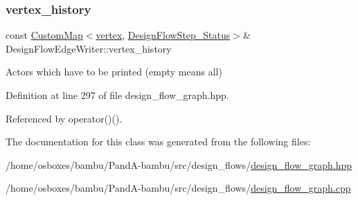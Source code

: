 \subsubsection{\texorpdfstring{vertex\+\_\+history}{vertex\_history}}
{\footnotesize\ttfamily const \hyperlink{custom__map_8hpp_a18ca01763abbe3e5623223bfe5aaac6b}{Custom\+Map}$<$\hyperlink{graph_8hpp_abefdcf0544e601805af44eca032cca14}{vertex}, \hyperlink{design__flow__step_8hpp_afb1f0d73069c26076b8d31dbc8ebecdf}{Design\+Flow\+Step\+\_\+\+Status}$>$\& Design\+Flow\+Edge\+Writer\+::vertex\+\_\+history\hspace{0.3cm}{\ttfamily [private]}}



Actors which have to be printed (empty means all) 



Definition at line 297 of file design\+\_\+flow\+\_\+graph.\+hpp.



Referenced by operator()().



The documentation for this class was generated from the following files\+:\begin{DoxyCompactItemize}
\item 
/home/osboxes/bambu/\+Pand\+A-\/bambu/src/design\+\_\+flows/\hyperlink{design__flow__graph_8hpp}{design\+\_\+flow\+\_\+graph.\+hpp}\item 
/home/osboxes/bambu/\+Pand\+A-\/bambu/src/design\+\_\+flows/\hyperlink{design__flow__graph_8cpp}{design\+\_\+flow\+\_\+graph.\+cpp}\end{DoxyCompactItemize}
